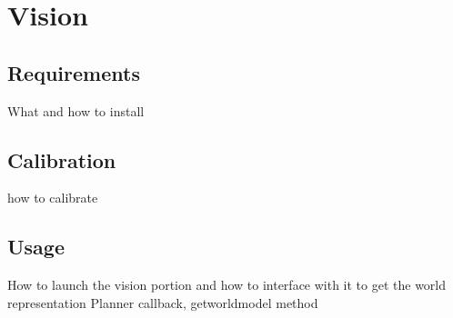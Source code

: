 \section{Vision}
\subsection{Requirements}
What and how to install

\subsection{Calibration}
how to calibrate

\subsection{Usage}
How to launch the vision portion and how to interface with it to get the world representation
Planner callback, getworldmodel method